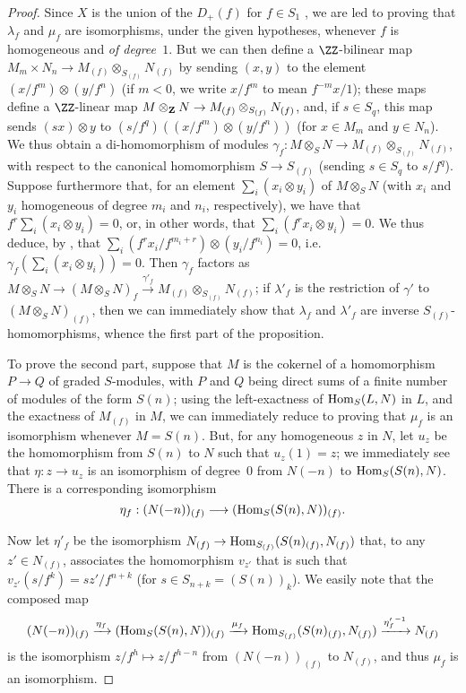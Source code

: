 \begin{proof}
Since $X$ is the union of the $D_+(f)$ for $f\in S_1$ , we are led to proving that $\lambda_f$ and $\mu_f$ are isomorphisms, under the given hypotheses, whenever $f$ is homogeneous and \emph{of degree~$1$}.
But we can then define a $\ZZ$-bilinear map $M_m\times N_n\to M_{(f)}\otimes_{S_{(f)}}N_{(f)}$ by sending $(x,y)$ to the element $(x/f^m)\otimes(y/f^n)$ (if $m<0$, we write $x/f^m$ to mean $f^{-m}x/1$);
these maps define a $\ZZ$-linear map $M\otimes_{\bb{Z}}N\to M_{(f)}\otimes_{S_{(f)}}N_{(f)}$, and, if $s\in S_q$, this map sends $(sx)\otimes y$ to $(s/f^q)((x/f^m)\otimes(y/f^n))$ (for $x\in M_m$ and $y\in N_n$).
We thus obtain a di-homomorphism of modules $\gamma_f: M\otimes_S N\to M_{(f)}\otimes_{S_{(f)}}N_{(f)}$, with respect to the canonical homomorphism $S\to S_{(f)}$ (sending $s\in S_q$ to $s/f^q$).
Suppose furthermore that, for an element $\sum_i(x_i\otimes y_i)$ of $M\otimes_S N$ (with $x_i$ and $y_i$ homogeneous of degree $m_i$ and $n_i$, respectively), we have that $f^r\sum_i(x_i\otimes y_i)=0$, or, in other words, that $\sum_i(f^rx_i\otimes y_i)=0$.
We thus deduce, by , that $\sum_i(f^rx_i/f^{m_i+r})\otimes(y_i/f^{n_i})=0$, i.e. $\gamma_f(\sum_i(x_i\otimes y_i))=0$.
Then $\gamma_f$ factors as $M\otimes_S N\to(M\otimes_S N)_f\xrightarrow{\gamma'_f}M_{(f)}\otimes_{S_{(f)}}N_{(f)}$;
if $\lambda'_f$ is the restriction of $\gamma'$
to $(M\otimes_S N)_{(f)}$, then we can immediately show that $\lambda_f$ and $\lambda'_f$ are inverse $S_{(f)}$-homomorphisms, whence the first part of the proposition.

To prove the second part, suppose that $M$ is the cokernel of a homomorphism $P\to Q$ of graded $S$-modules, with $P$ and $Q$ being direct sums of a finite number of modules of the form $S(n)$;
using the left-exactness of $\operatorname{Hom}_S(L,N)$ in $L$, and the exactness of $M_{(f)}$ in $M$, we can immediately reduce to proving that $\mu_f$ is an isomorphism whenever $M=S(n)$.
But, for any homogeneous $z$ in $N$, let $u_z$ be the homomorphism from $S(n)$ to $N$ such that $u_z(1)=z$;
we immediately see that $\eta: z\to u_z$ is an isomorphism of degree~$0$ from $N(-n)$ to $\operatorname{Hom}_S(S(n),N)$.
There is a corresponding isomorphism
\[
  \eta_f: (N(-n))_{(f)} \to (\Hom_S(S(n),N))_{(f)}.
\]

Now let $\eta'_f$ be the isomorphism $N_{(f)}\to\Hom_{S_{(f)}}(S(n)_{(f)},N_{(f)})$ that, to any $z'\in N_{(f)}$, associates the homomorphism $v_{z'}$ that is such that $v_{z'}(s/f^k)=sz'/f^{n+k}$ (for $s\in S_{n+k}=(S(n))_k$).
We easily note that the composed map
\[
  (N(-n))_{(f)}
  \xrightarrow{\eta_f} (\operatorname{Hom}_S(S(n),N))_{(f)}
  \xrightarrow{\mu_f} \operatorname{Hom}_{S_{(f)}}(S(n)_{(f)},N_{(f)})
  \xrightarrow{{\eta'_f}^{-1}} N_{(f)}
\]
is the isomorphism $z/f^h\mapsto z/f^{h-n}$ from $(N(-n))_{(f)}$ to $N_{(f)}$, and thus $\mu_f$ is an isomorphism.
\end{proof}


